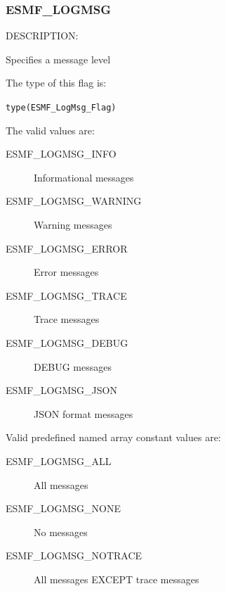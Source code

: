\subsubsection{ESMF\_LOGMSG}
\label{const:logmsgflag}

{\sf DESCRIPTION:\\}
\begin{sloppypar}
Specifies a message level
\end{sloppypar}

The type of this flag is:

{\tt type(ESMF\_LogMsg\_Flag)}

The valid values are:
\begin{description}
   \item [ESMF\_LOGMSG\_INFO] 
         Informational messages
   \item [ESMF\_LOGMSG\_WARNING]
         Warning messages
   \item [ESMF\_LOGMSG\_ERROR]
         Error messages
   \item [ESMF\_LOGMSG\_TRACE]
         Trace messages
   \item [ESMF\_LOGMSG\_DEBUG]
         DEBUG messages
   \item [ESMF\_LOGMSG\_JSON]
         JSON format messages
\end{description}

Valid predefined named array constant values are:

\begin{description}
	\item [ESMF\_LOGMSG\_ALL]
		All messages
	\item [ESMF\_LOGMSG\_NONE]
		No messages
	\item [ESMF\_LOGMSG\_NOTRACE]
		All messages EXCEPT trace messages
\end{description}


